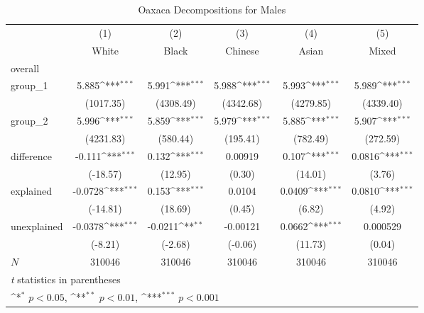\begin{table}[htbp]\centering
\def\sym#1{\ifmmode^{#1}\else\(^{#1}\)\fi}
\caption{Oaxaca Decompositions for Males\label{tab1}}
\begin{tabular}{l*{5}{c}}
\hline\hline
            &\multicolumn{1}{c}{(1)}&\multicolumn{1}{c}{(2)}&\multicolumn{1}{c}{(3)}&\multicolumn{1}{c}{(4)}&\multicolumn{1}{c}{(5)}\\
            &\multicolumn{1}{c}{White}&\multicolumn{1}{c}{Black}&\multicolumn{1}{c}{Chinese}&\multicolumn{1}{c}{Asian}&\multicolumn{1}{c}{Mixed}\\
\hline
overall     &                     &                     &                     &                     &                     \\
group\_1     &       5.885\sym{***}&       5.991\sym{***}&       5.988\sym{***}&       5.993\sym{***}&       5.989\sym{***}\\
            &   (1017.35)         &   (4308.49)         &   (4342.68)         &   (4279.85)         &   (4339.40)         \\
group\_2     &       5.996\sym{***}&       5.859\sym{***}&       5.979\sym{***}&       5.885\sym{***}&       5.907\sym{***}\\
            &   (4231.83)         &    (580.44)         &    (195.41)         &    (782.49)         &    (272.59)         \\
difference  &      -0.111\sym{***}&       0.132\sym{***}&     0.00919         &       0.107\sym{***}&      0.0816\sym{***}\\
            &    (-18.57)         &     (12.95)         &      (0.30)         &     (14.01)         &      (3.76)         \\
explained   &     -0.0728\sym{***}&       0.153\sym{***}&      0.0104         &      0.0409\sym{***}&      0.0810\sym{***}\\
            &    (-14.81)         &     (18.69)         &      (0.45)         &      (6.82)         &      (4.92)         \\
unexplained &     -0.0378\sym{***}&     -0.0211\sym{**} &    -0.00121         &      0.0662\sym{***}&    0.000529         \\
            &     (-8.21)         &     (-2.68)         &     (-0.06)         &     (11.73)         &      (0.04)         \\
\hline
\(N\)       &      310046         &      310046         &      310046         &      310046         &      310046         \\
\hline\hline
\multicolumn{6}{l}{\footnotesize \textit{t} statistics in parentheses}\\
\multicolumn{6}{l}{\footnotesize \sym{*} \(p<0.05\), \sym{**} \(p<0.01\), \sym{***} \(p<0.001\)}\\
\end{tabular}
\end{table}
